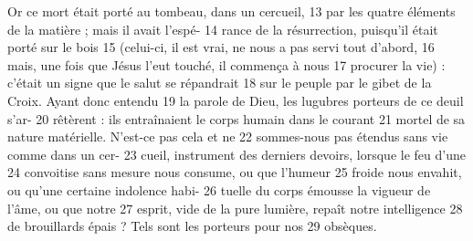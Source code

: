 Or ce mort était porté au tombeau, dans un cercueil,	 
13	 	par les quatre éléments de la matière ; mais il avait l'espé-	 
14	 	rance de la résurrection, puisqu'il était porté sur le bois	 
15	 	(celui-ci, il est vrai, ne nous a pas servi tout d'abord,	 
16	 	mais, une fois que Jésus l'eut touché, il commença à nous	 
17	 	procurer la vie) : c'était un signe que le salut se répandrait	 
18	 	sur le peuple par le gibet de la Croix. Ayant donc entendu	 
19	 	la parole de Dieu, les lugubres porteurs de ce deuil s'ar-	 
20	 	rêtèrent : ils entraînaient le corps humain dans le courant	 
21	 	mortel de sa nature matérielle. N'est-ce pas cela et ne	 
22	 	sommes-nous pas étendus sans vie comme dans un cer-	 
23	 	cueil, instrument des derniers devoirs, lorsque le feu d'une	 
24	 	convoitise sans mesure nous consume, ou que l'humeur	 
25	 	froide nous envahit, ou qu'une certaine indolence habi-	 
26	 	tuelle du corps émousse la vigueur de l'âme, ou que notre	 
27	 	esprit, vide de la pure lumière, repaît notre intelligence	 
28	 	de brouillards épais ? Tels sont les porteurs pour nos	 
29	 	obsèques.	 
 